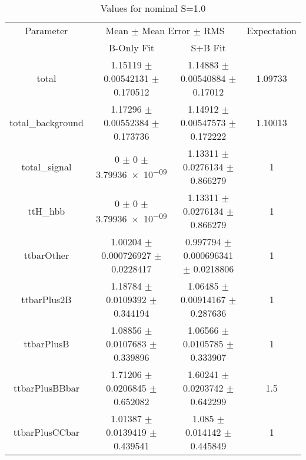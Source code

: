 \begin{table}
\centering
\caption{Values for nominal S=1.0}
\begin{tabular}{cccc}
\toprule
Parameter & \multicolumn{2}{c}{Mean $\pm$ Mean Error $\pm$ RMS} & Expectation\\
 & B-Only Fit & S+B Fit & \\
\midrule
total & \num{1.15119} $\pm$ \num{0.00542131} $\pm$ \num{0.170512} & \num{1.14883} $\pm$ \num{0.00540884} $\pm$ \num{0.17012} & \num{1.09733}\\
total\_background & \num{1.17296} $\pm$ \num{0.00552384} $\pm$ \num{0.173736} & \num{1.14912} $\pm$ \num{0.00547573} $\pm$ \num{0.172222} & \num{1.10013}\\
total\_signal & \num{0} $\pm$ \num{0} $\pm$ \num{3.79936e-09} & \num{1.13311} $\pm$ \num{0.0276134} $\pm$ \num{0.866279} & \num{1}\\
ttH\_hbb & \num{0} $\pm$ \num{0} $\pm$ \num{3.79936e-09} & \num{1.13311} $\pm$ \num{0.0276134} $\pm$ \num{0.866279} & \num{1}\\
ttbarOther & \num{1.00204} $\pm$ \num{0.000726927} $\pm$ \num{0.0228417} & \num{0.997794} $\pm$ \num{0.000696341} $\pm$ \num{0.0218806} & \num{1}\\
ttbarPlus2B & \num{1.18784} $\pm$ \num{0.0109392} $\pm$ \num{0.344194} & \num{1.06485} $\pm$ \num{0.00914167} $\pm$ \num{0.287636} & \num{1}\\
ttbarPlusB & \num{1.08856} $\pm$ \num{0.0107683} $\pm$ \num{0.339896} & \num{1.06566} $\pm$ \num{0.0105785} $\pm$ \num{0.333907} & \num{1}\\
ttbarPlusBBbar & \num{1.71206} $\pm$ \num{0.0206845} $\pm$ \num{0.652082} & \num{1.60241} $\pm$ \num{0.0203742} $\pm$ \num{0.642299} & \num{1.5}\\
ttbarPlusCCbar & \num{1.01387} $\pm$ \num{0.0139419} $\pm$ \num{0.439541} & \num{1.085} $\pm$ \num{0.014142} $\pm$ \num{0.445849} & \num{1}\\
\bottomrule
\end{tabular}
\end{table}